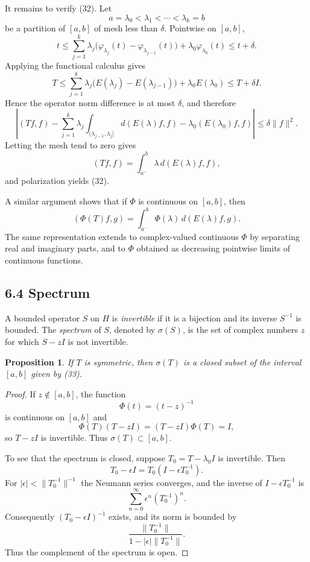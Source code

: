 \documentclass[11pt,openany]{book}
\newtheorem{proposition}[theorem]{Proposition}
\begin{document}
It remains to verify (32). Let
\[
a=\lambda_0<\lambda_1<\cdots<\lambda_k=b
\]
be a partition of $[a,b]$ of mesh less than $\delta$. Pointwise on $[a,b]$,
\[
 t\leq
\sum_{j=1}^k\lambda_j\bigl(\varphi_{\lambda_j}(t)-\varphi_{\lambda_{j-1}}(t)\bigr)
+\lambda_0\varphi_{\lambda_0}(t)
\leq t+\delta.
\]
Applying the functional calculus gives
\[
T\leq
\sum_{j=1}^k\lambda_j\bigl(E(\lambda_j)-E(\lambda_{j-1})\bigr)
+\lambda_0E(\lambda_0)
\leq T+\delta I.
\]
Hence the operator norm difference is at most $\delta$, and therefore
\[
\left|
(Tf,f)-
\sum_{j=1}^k\lambda_j\int_{(\lambda_{j-1},\lambda_j]}d(E(\lambda)f,f)
-\lambda_0(E(\lambda_0)f,f)
\right|
\leq\delta\|f\|^2.
\]
Letting the mesh tend to zero gives
\[
(Tf,f)=\int_{a^-}^{b}\lambda\,d(E(\lambda)f,f),
\]
and polarization yields (32).

A similar argument shows that if $\Phi$ is continuous on $[a,b]$, then
\begin{equation}
(\Phi(T)f,g)=\int_{a^-}^{b}\Phi(\lambda)\,d(E(\lambda)f,g).
\tag{36}
\end{equation}
The same representation extends to complex-valued continuous $\Phi$ by separating real and imaginary parts, and to $\Phi$ obtained as decreasing pointwise limits of continuous functions.

\subsection*{6.4 Spectrum}

A bounded operator $S$ on $H$ is \emph{invertible} if it is a bijection and its inverse $S^{-1}$ is bounded. The \emph{spectrum} of $S$, denoted by $\sigma(S)$, is the set of complex numbers $z$ for which $S-zI$ is not invertible.

\begin{proposition}
If $T$ is symmetric, then $\sigma(T)$ is a closed subset of the interval $[a,b]$ given by (33).
\end{proposition}

\begin{proof}
If $z\notin[a,b]$, the function
\[
\Phi(t)=(t-z)^{-1}
\]
is continuous on $[a,b]$ and
\[
\Phi(T)(T-zI)=(T-zI)\Phi(T)=I,
\]
so $T-zI$ is invertible. Thus $\sigma(T)\subset[a,b]$.

To see that the spectrum is closed, suppose $T_0=T-\lambda_0I$ is invertible. Then
\[
T_0-\epsilon I=T_0(I-\epsilon T_0^{-1}).
\]
For $|\epsilon|<\|T_0^{-1}\|^{-1}$ the Neumann series converges, and the inverse of $I-\epsilon T_0^{-1}$ is
\[
\sum_{n=0}^{\infty}\epsilon^n(T_0^{-1})^n.
\]
Consequently $(T_0-\epsilon I)^{-1}$ exists, and its norm is bounded by
\begin{equation}
\frac{\|T_0^{-1}\|}{1-|\epsilon|\|T_0^{-1}\|}.
\tag{37}
\end{equation}
Thus the complement of the spectrum is open.
\end{proof}
\end{document}
